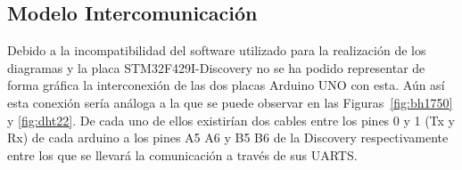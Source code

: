\subsection{Modelo Intercomunicaci\'on}\label{sec:mod-intercom}
Debido a la incompatibilidad del software utilizado para la
realizaci\'on de los diagramas y la placa STM32F429I-Discovery no se
ha podido representar de forma gr\'afica la interconexi\'on de las dos
placas Arduino UNO con esta. A\'un as\'i esta conexi\'on ser\'ia
an\'aloga a la que se puede observar en las Figuras~\ref{fig:bh1750} y
\ref{fig:dht22}. De cada uno de ellos existir\'ian dos cables entre
los pines 0 y 1 (Tx y Rx) de cada arduino a los pines A5 A6 y B5 B6 de
la Discovery respectivamente entre los que se llevar\'a la
comunicaci\'on a trav\'es de sus  UARTS.
